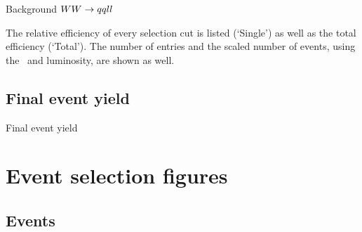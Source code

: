 \documentclass{beamer}
\newcommand{\texpath}{../analysis/tex/tex_ex}
\begin{document}
\begin{frame}{Background $WW\rightarrow qqll$}

The relative efficiency of every selection cut is listed (`Single') as well as the total efficiency (`Total').
%
The number of entries and the scaled number of events, using the \xsec\ and luminosity, are shown as well.
\end{frame}

\subsection{Final event yield}

\begin{frame}{Final event yield}

\end{frame}












\section{Event selection figures}


\subsection{Events}
\end{document}
